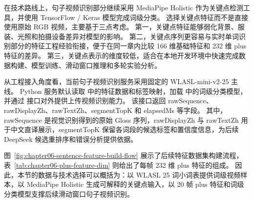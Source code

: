 在技术路线上，句子视频识别部分继续采用 MediaPipe Holistic 作为关键点检测工具，并使用 TensorFlow / Keras 模型完成词级分类。
选择关键点特征而不是直接使用原始 RGB 视频，主要基于三点考虑。
第一，关键点特征能够弱化背景、服装、光照和拍摄设备差异对模型的影响。
第二，关键点序列更容易与实时单词识别部分的特征工程经验衔接，便于在同一章内比较 166 维基础特征和 232 维 plus 特征的差异。
第三，关键点表示的维度较低，适合在本地开发环境中快速完成数据构建、模型训练、滑动窗口推理和多轮实验分析。

从工程接入角度看，当前句子视频识别服务采用固定的 WLASL-mini-v2-25 主线。
Python 服务默认读取  中的特征数据和标签映射，加载  中的词级分类模型，并通过  接口对外提供上传视频识别能力。
该接口返回 rawSequence、rawDisplayZh、rawTextZh、segmentTopK 和 elapsedMs 等字段。
其中，rawSequence 是视觉识别得到的原始 Gloss 序列，rawDisplayZh 与 rawTextZh 用于中文直译展示，segmentTopK 保留各词段的候选标签和置信度信息，为后续 DeepSeek 候选重排序和错误分析提供依据。

图~\ref{fig:chapter06-sentence-feature-build-flow} 展示了后续特征数据集构建流程，表~\ref{tab:chapter06-plus-feature-dim} 则给出了每帧 232 维 plus 特征的组成。
因此，本节的数据与技术选择可以概括为：以 WLASL 25 词小词表提供词级视频样本，以 MediaPipe Holistic 生成可解释的关键点输入，以 20 帧 plus 特征和词级分类模型支撑后续滑动窗口句子视频识别。
